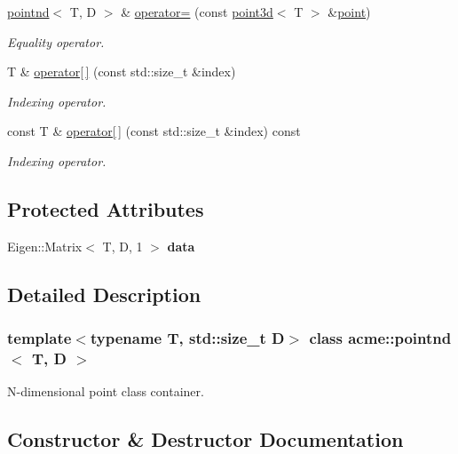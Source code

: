 \begin{DoxyCompactItemize}
\hyperlink{classacme_1_1pointnd}{pointnd}$<$ T, D $>$ \& \hyperlink{classacme_1_1pointnd_a90082456348fdb8303c5cf9d31abe847}{operator=} (const \hyperlink{classacme_1_1point3d}{point3d}$<$ T $>$ \&\hyperlink{classacme_1_1point}{point})
\begin{DoxyCompactList}\small\item\em Equality operator. \end{DoxyCompactList}\item 
T \& \hyperlink{classacme_1_1pointnd_a35b0691673728d98d455c007612d6b91}{operator\mbox{[}$\,$\mbox{]}} (const std\+::size\+\_\+t \&index)
\begin{DoxyCompactList}\small\item\em Indexing operator. \end{DoxyCompactList}\item 
const T \& \hyperlink{classacme_1_1pointnd_a565e9ed195c8f8dadc570a029a3deb94}{operator\mbox{[}$\,$\mbox{]}} (const std\+::size\+\_\+t \&index) const
\begin{DoxyCompactList}\small\item\em Indexing operator. \end{DoxyCompactList}\end{DoxyCompactItemize}
\subsection*{Protected Attributes}
\begin{DoxyCompactItemize}
\item 
\mbox{\label{classacme_1_1pointnd_a13b19080ed617e2a9c5d6058f07d4f4b}} 
Eigen\+::\+Matrix$<$ T, D, 1 $>$ {\bfseries data}
\end{DoxyCompactItemize}


\subsection{Detailed Description}
\subsubsection*{template$<$typename T, std\+::size\+\_\+t D$>$\newline
class acme\+::pointnd$<$ T, D $>$}

N-\/dimensional point class container. 

\subsection{Constructor \& Destructor Documentation}
\mbox{\label{classacme_1_1pointnd_aeabd8c2c9028247e3f92362755aa9806}} 
